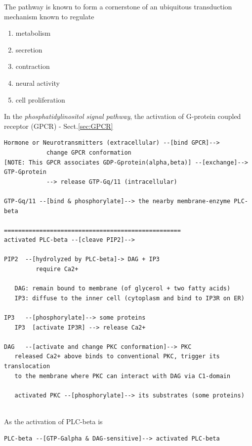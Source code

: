 The pathway is known to form a cornerstone of an ubiquitous transduction
mechanism known to regulate
\begin{enumerate}
  \item metabolism
  \item secretion
  \item contraction 
  \item neural activity
  \item cell proliferation
\end{enumerate}

In the {\it phosphatidylinositol signal pathway}, the activation of G-protein
coupled receptor (GPCR) - Sect.\ref{sec:GPCR}

\begin{verbatim}
Hormone or Neurotransmitters (extracellular) --[bind GPCR]--> 
            change GPCR conformation 
[NOTE: This GPCR associates GDP-Gprotein(alpha,beta)] --[exchange]--> GTP-Gprotein
            --> release GTP-Gq/11 (intracellular)

GTP-Gq/11 --[bind & phosphorylate]--> the nearby membrane-enzyme PLC-beta

==================================================
activated PLC-beta --[cleave PIP2]-->

PIP2  --[hydrolyzed by PLC-beta]-> DAG + IP3
         require Ca2+  
   
   DAG: remain bound to membrane (of glycerol + two fatty acids)
   IP3: diffuse to the inner cell (cytoplasm and bind to IP3R on ER)
   
IP3   --[phosphorylate]--> some proteins
   IP3  [activate IP3R] --> release Ca2+    

DAG   --[activate and change PKC conformation]--> PKC
   released Ca2+ above binds to conventional PKC, trigger its translocation 
   to the membrane where PKC can interact with DAG via C1-domain
   
   activated PKC --[phosphorylate]--> its substrates (some proteins)
   
\end{verbatim}  

As the activation of PLC-beta is 
\begin{verbatim}
PLC-beta --[GTP-Galpha & DAG-sensitive]--> activated PLC-beta
\end{verbatim}

